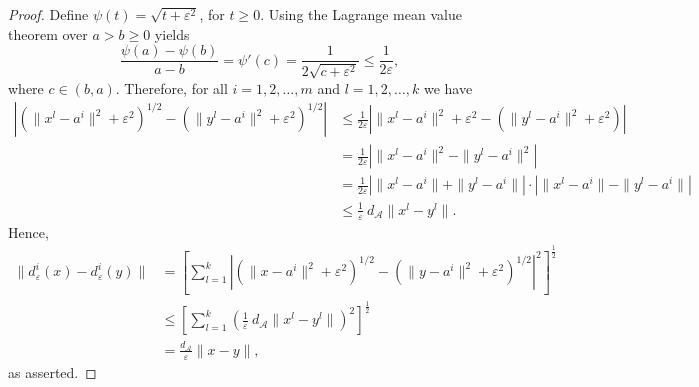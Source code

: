 \documentclass[11pt]{article}
\numberwithin{equation}{section}
\def\abs#1{\left\lvert#1\right\rvert}
\begin{document}
\begin{proof}
Define $\psi(t)=\sqrt{t + {\varepsilon}^2}$, for $t \geq 0$. Using the Lagrange mean value theorem over $a > b \geq 0$ yields
\begin{equation*}
	\frac{\psi(a) - \psi(b)}{a - b} = \psi'(c) = \frac{1}{2\sqrt{c + {\varepsilon}^2}} \leq \frac{1}{2\varepsilon},
\end{equation*}
where $c \in (b,a)$.
Therefore, for all $i=1,2, \ldots, m$ and $l=1,2, \ldots, k$ we have
\begin{align*}
	\abs{\left( \|x^l-a^i\|^2  + {\varepsilon}^2 \right)^{1/2} - \left( \|y^l-a^i\|^2 + {\varepsilon}^2 \right)^{1/2} } 
	&\leq \frac{1}{2\varepsilon} \abs{ \|x^l-a^i\|^2 + {\varepsilon}^2 - \left( \|y^l-a^i\|^2 + {\varepsilon}^2 \right) } \\
	&= \frac{1}{2\varepsilon} \abs{\|x^l-a^i\|^2 - \|y^l-a^i\|^2} \\
	&= \frac{1}{2\varepsilon} \abs{\|x^l-a^i\| + \|y^l-a^i\|} \cdot \abs{\|x^l-a^i\| - \|y^l-a^i\|} \\
	&\leq \frac{1}{\varepsilon} \: d_{\mathcal{A}}\|x^l-y^l\| .
\end{align*}
Hence,
\begin{align*}
	\|d_{\varepsilon}^i(x) - d_{\varepsilon}^i(y)\| 
	&= \left[ \sum_{l=1}^{k} \abs{\left( \|x-a^i\|^2  + {\varepsilon}^2 \right)^{1/2} - \left( \|y-a^i\|^2 + {\varepsilon}^2 \right)^{1/2} }^2 \right]^\frac{1}{2} \\
	&\leq \left[ \sum_{l=1}^{k} \left( \frac{1}{\varepsilon} \: d_{\mathcal{A}}\|x^l-y^l\| \right)^2 \right]^\frac{1}{2} \\
	&= \frac{ d_{\mathcal{A}}}{\varepsilon}\|x-y\| ,
\end{align*}
as asserted.
\end{proof}
\end{document}
